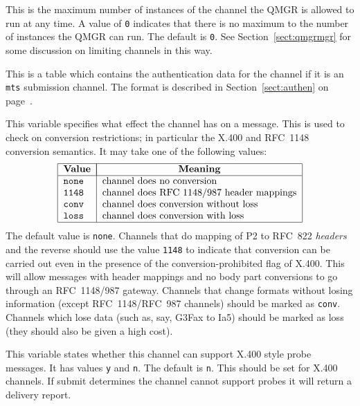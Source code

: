 \begin{describe}
\item[\verb+maxproc=value+:]
This is the maximum number of instances of the channel the QMGR is
allowed to run at any time.  A value of \verb+0+ indicates that there
is no maximum to the number of instances the QMGR can run.  The
default is \verb+0+. See Section~\ref{sect:qmgrmgr} for some discussion
on limiting channels in this way.

\item[\verb+auth-table=value+:]
This is a table which contains the authentication data for the channel
if it is an \verb+mts+ submission channel. The format is described in
Section~\ref{sect:authen} on page~\pageref{sect:authen}.

\item[\verb|conv=value|:]
This variable specifies what effect the channel has on a message. This
is used to check on conversion restrictions; in particular the X.400
and RFC~1148 conversion semantics. It may take one of the following
values:
\[\begin{tabular}{|l|l|}
\hline
	\multicolumn{1}{|c|}{\bf Value} &
		\multicolumn{1}{|c|}{\bf Meaning}\\
\hline
	\tt	none&	channel does no conversion\\
	\tt	1148&	channel does RFC 1148/987 header mappings\\
	\tt	conv&	channel does conversion without loss\\
	\tt	loss&	channel does conversion with loss\\
\hline
\end{tabular}\]
The default value is \verb|none|. Channels that do mapping of P2 to
RFC~822 {\em headers} and the reverse should use the value \verb|1148|
to indicate that conversion can be carried out even in the presence of
the conversion-prohibited flag of X.400. This will allow messages with
header mappings and no body part conversions to go through an
RFC~1148/987 gateway. Channels that change formats without losing
information (except RFC~1148/RFC~987 channels) should be marked as
\verb|conv|. Channels which lose data (such as, say, G3Fax to Ia5)
should be marked as loss (they should also be given a high cost).


\item[\verb|probe=value|:]
This variable states whether this channel can support X.400 style
probe messages. It has values \verb|y| and \verb|n|. The default is
\verb|n|. This should be set for X.400 channels. If submit determines
the channel cannot support probes it will return a delivery report.


\end{describe}
